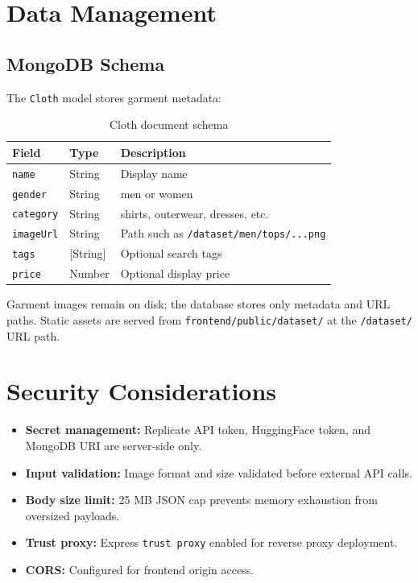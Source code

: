 \section{Data Management}
\label{sec:data-management}

\subsection{MongoDB Schema}

The \texttt{Cloth} model stores garment metadata:

\begin{table}[H]
  \centering
  \caption{Cloth document schema}
  \label{tab:cloth-schema}
  \begin{tabular}{@{}llp{7cm}@{}}
    \toprule
    \textbf{Field} & \textbf{Type} & \textbf{Description} \\
    \midrule
    \texttt{name} & String & Display name \\
    \texttt{gender} & String & men or women \\
    \texttt{category} & String & shirts, outerwear, dresses, etc. \\
    \texttt{imageUrl} & String & Path such as \texttt{/dataset/men/tops/...png} \\
    \texttt{tags} & [String] & Optional search tags \\
    \texttt{price} & Number & Optional display price \\
    \bottomrule
  \end{tabular}
\end{table}

Garment images remain on disk; the database stores only metadata and URL paths. Static assets are served from \texttt{frontend/public/dataset/} at the \texttt{/dataset/} URL path.

\section{Security Considerations}
\label{sec:security}

\begin{itemize}[leftmargin=*]
  \item \textbf{Secret management:} Replicate API token, HuggingFace token, and MongoDB URI are server-side only.
  \item \textbf{Input validation:} Image format and size validated before external API calls.
  \item \textbf{Body size limit:} 25 MB JSON cap prevents memory exhaustion from oversized payloads.
  \item \textbf{Trust proxy:} Express \texttt{trust proxy} enabled for reverse proxy deployment.
  \item \textbf{CORS:} Configured for frontend origin access.
\end{itemize}

